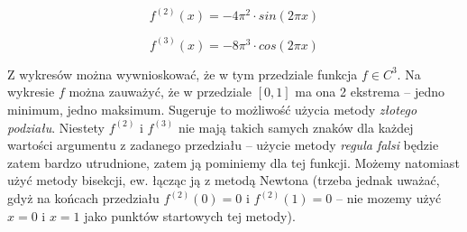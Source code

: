 \documentclass[a4paper,11pt]{article}
\begin{document}
      \begin{center}
      \end{center}
      $$ f^{(2)}(x) = -4 \pi^2 \cdot sin(2 \pi x) $$
      \begin{center}
      \end{center}
      $$ f^{(3)}(x) = -8 \pi^3 \cdot cos(2 \pi x) $$
      
      Z wykresów można wywnioskować, że w tym przedziale funkcja $ f \in C^3 $. Na wykresie $ f $ można zauważyć, że w przedziale $[0,1]$ ma ona 2 ekstrema -- jedno minimum, jedno maksimum. Sugeruje to możliwość użycia metody \emph{złotego podziału}. Niestety $f^{(2)}$ i $f^{(3)}$ nie mają takich samych znaków dla każdej wartości argumentu z zadanego przedziału -- użycie metody \emph{regula falsi} będzie zatem bardzo utrudnione, zatem ją pominiemy dla tej funkcji. Możemy natomiast użyć metody bisekcji, ew. łącząc ją z metodą Newtona (trzeba jednak uważać, gdyż na końcach przedziału $f^{(2)}(0) = 0$ i $f^{(2)}(1) = 0$ -- nie mozemy użyć $ x = 0 $ i $ x = 1 $ jako punktów startowych tej metody).
      
\end{document}
